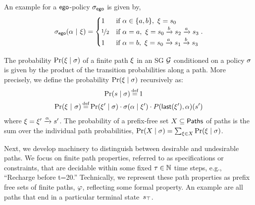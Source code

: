 {{{%


\begin{example}
  An example for a $\mathsf{ego}$-policy ${\sigma_{\mathsf{ego}}}$ is given
  by,
  \begin{equation}
    {\sigma_{\mathsf{ego}}}(\alpha~|~\xi) =
    \begin{cases}
      1 & \text{if } \alpha \in \{ a,b \}, ~\xi = s_0\\
      \nicefrac{1}{2} & \text{if } \alpha = a,~\xi = s_0\xrightarrow{b}s_2 \xrightarrow{a} s_3\\
      1 & \text{if } \alpha = b,~\xi = s_0\xrightarrow{a}s_1\xrightarrow{b}s_3\\
    \end{cases}.
  \end{equation}
\end{example}


The probability $\Pr(\xi \mid \sigma)$ of a finite path $\xi$ in an SG $\mathcal{G}$ conditioned on a policy $\sigma$ is given by the product of the transition probabilities along a path. 
More precisely, we define the probability $\Pr(\xi \mid \sigma)$ recursively as:
\begin{equation}
  \begin{split}
    \Pr(s \mid \sched) &\eqdef 1\\
    \Pr(\path~|~\sigma) \eqdef \Pr(\path'\mid\sched)\cdot \sched(&\act\mid\path') \cdot P(\last{\path'},\act)(s')
  \end{split}
\end{equation}
where $\xi =  \xi' \xrightarrow{\alpha} s'$.
The probability of a prefix-free set $X \subseteq \mathsf{Paths}^{}_{}$  of paths is the sum over the individual path probabilities, $\Pr(X \mid \sigma) = \sum_{\xi \in X} \Pr(\xi \mid \sigma )$.

Next, we develop machinery to distinguish between desirable and
undesirable paths. We focus on finite path properties,
referred to as specifications or constraints, that are decidable
within some fixed $\tau \in \mathbb{N}$ time steps, e.g., ``Recharge before
t=20.'' Technically, we represent these path properties as prefix free
sets of finite paths, $\varphi$, reflecting some formal
property\footnotemark. An example are all paths that end in a particular terminal state~$s_{\top}$.

}}}
